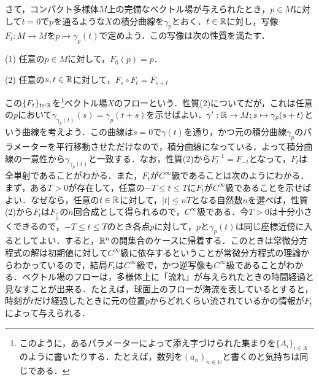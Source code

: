 さて，コンパクト多様体$M$上の完備なベクトル場が与えられたとき，$p\in M$に対して$t=0$で$p$を通るような$X$の積分曲線を$\gamma_p$とおく．$t\in{\mathbb R}$に対し，写像$F_t:M\rightarrow M$を$p\mapsto \gamma_p(t)$で定めよう．この写像は次の性質を満たす．
\begin{description}
\item{(1)} 任意の$p\in M$に対して，$F_0(p)=p$．
\item{(2)} 任意の$s,t\in{\mathbb R}$に対して，$F_s\circ F_t=F_{s+t}$
\end{description}
この$\{F_t\}_{t\in{\mathbb R}}$を\footnote{このように，あるパラメーターによって添え字づけられた集まりを$\{A_i\}_{i\in \Lambda}$のように書いたりする．たとえば，数列を$(a_n)_{n\in {\mathbb N}}$と書くのと気持ちは同じである．}ベクトル場$X$のフローという．性質(2)についてだが，これは任意の$p$において$\gamma_{\gamma_p(t)}(s)=\gamma_p(t+s)$を示せばよい．$\gamma':{\mathbb R}\rightarrow M;s\mapsto\gamma_p(s+t)$という曲線を考えよう．この曲線は$s=0$で$\gamma(t)$を通り，かつ元の積分曲線$\gamma_p$のパラメーターを平行移動させただけなので，積分曲線になっている．よって積分曲線の一意性から$\gamma_{\gamma_p(t)}$と一致する．なお，性質(2)から$F_t^{-1}=F_{-t}$となって，$F_t$は全単射であることがわかる．また，$F_t$が$C^\infty$級であることは次のようにわかる．まず，ある$T>0$が存在して，任意の$-T\le t\le T$に$F_t$が$C^\infty$級であることを示せばよい．なぜなら，任意の$t\in{\mathbb R}$に対して，$|t| \le nT$となる自然数$n$を選べば，性質(2)から$F_t$は$F_{\frac{t}{n}}$の$n$回合成として得られるので，$C^\infty$級である．今$T>0$は十分小さくできるので，$-T\le t \le T$のとき各点$p$に対して，$p$と$\gamma_p(t)$は同じ座標近傍に入るとしてよい．すると，${\mathbb R}^n$の開集合のケースに帰着する．このときは常微分方程式の解は初期値に対して$C^\infty$級に依存するということが常微分方程式の理論からわかっているので，結局$F_t$は$C^\infty$級で，かつ逆写像も$C^\infty$級であることがわかる．ベクトル場のフローは，多様体上に「流れ」が与えられたときの時間経過と見なすことが出来る．たとえば，球面上のフローが海流を表しているとすると，時刻が$t$だけ経過したときに元の位置$p$からどれくらい流されているかの情報が$F_t$によって与えられる．


